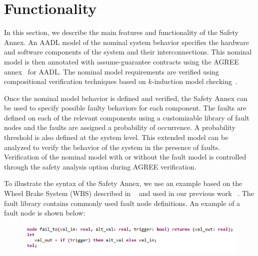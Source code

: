 \section{Functionality}
In this section, we describe the main features and functionality of the Safety Annex.
%
An AADL model of the nominal system behavior specifies the hardware and software components of the system and their interconnections. This nominal model is then annotated with assume-guarantee contracts using the AGREE annex~\cite{NFM2012:CoGaMiWhLaLu} for AADL. The nominal model  requirements are verified using compositional verification techniques based on $k$-induction model checking~\cite{NFM2012:CoGaMiWhLaLu}.

Once the nominal model behavior is defined and verified, the Safety Annex can be used to specify possible faulty behaviors for each component. The faults are defined on each of the relevant components using a customizable library of fault nodes and the faults are assigned a probability of occurrence. A probability threshold is also defined at the system level. This extended model can be analyzed to verify the behavior of the system in the presence of faults. Verification of the nominal model with or without the fault model is controlled through the safety analysis option during AGREE verification.

To illustrate the syntax of the Safety Annex, we use an example based on the Wheel Brake System (WBS) described in ~\cite{AIR6110} and used in our previous work ~\cite{Stewart17:IMBSA}.
The fault library contains commonly used fault node definitions. An example of a fault node is shown below:
\begin{figure}[h!]
\vspace{-0.19in}
\begin{center}
\includegraphics[trim=0 9 0 5,clip,width=1.0\textwidth]{images/faultNode.png}
\end{center}
\vspace{-0.4in}
\end{figure}

